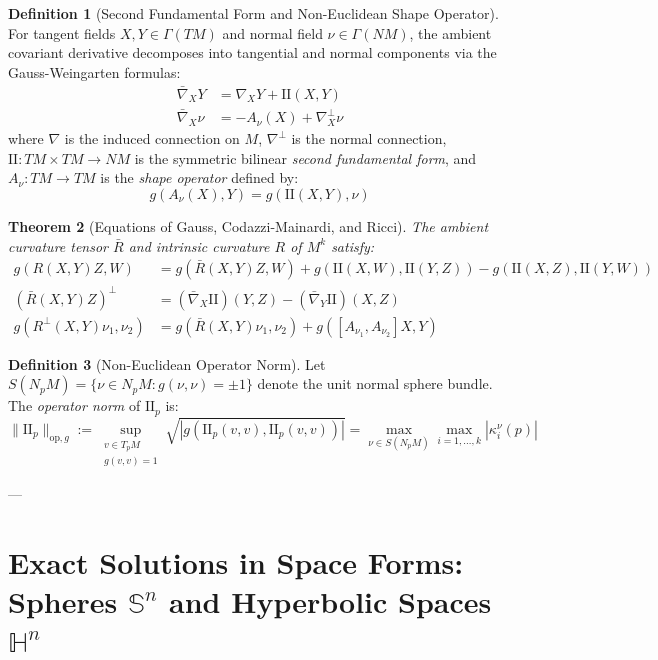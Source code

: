 \documentclass[11pt,reqno]{amsart}
\newtheorem{theorem}{Theorem}[section]
\theoremstyle{definition}
\newtheorem{definition}[theorem]{Definition}
\providecommand{\Hyp}{\mathbb{H}}
\providecommand{\Sph}{\mathbb{S}}
\providecommand{\II}{\mathrm{I\!I}}
\newcommand{\op}{\mathrm{op}}
\numberwithin{equation}{section}
\providecommand{\Hyp}{\mathbb{H}}
\providecommand{\Sph}{\mathbb{S}}
\providecommand{\II}{\mathrm{II}}
\begin{document}
\begin{definition}[Second Fundamental Form and Non-Euclidean Shape Operator]
For tangent fields $X, Y \in \Gamma(TM)$ and normal field $\nu \in \Gamma(NM)$, the ambient covariant derivative decomposes into tangential and normal components via the Gauss-Weingarten formulas:
\begin{align}
\bar{\nabla}_X Y &= \nabla_X Y + \II(X, Y) \\
\bar{\nabla}_X \nu &= -A_\nu(X) + \nabla^\perp_X \nu
\end{align}
where $\nabla$ is the induced connection on $M$, $\nabla^\perp$ is the normal connection, $\II: TM \times TM \to NM$ is the symmetric bilinear \emph{second fundamental form}, and $A_\nu: TM \to TM$ is the \emph{shape operator} defined by:
\begin{equation}
g(A_\nu(X), Y) = g(\II(X, Y), \nu)
\end{equation}
\end{definition}

\begin{theorem}[Equations of Gauss, Codazzi-Mainardi, and Ricci]
The ambient curvature tensor $\bar{R}$ and intrinsic curvature $R$ of $M^k$ satisfy:
\begin{align}
\label{eq:gauss}
g(R(X,Y)Z, W) &= g(\bar{R}(X,Y)Z, W) + g(\II(X,W), \II(Y,Z)) - g(\II(X,Z), \II(Y,W)) \\
\label{eq:codazzi}
(\bar{R}(X,Y)Z)^\perp &= (\bar{\nabla}_X \II)(Y,Z) - (\bar{\nabla}_Y \II)(X,Z) \\
\label{eq:ricci}
g(R^\perp(X,Y)\nu_1, \nu_2) &= g(\bar{R}(X,Y)\nu_1, \nu_2) + g([A_{\nu_1}, A_{\nu_2}]X, Y)
\end{align}
\end{theorem}

\begin{definition}[Non-Euclidean Operator Norm]
Let $S(N_pM) = \{\nu \in N_pM : g(\nu, \nu) = \pm 1\}$ denote the unit normal sphere bundle. The \emph{operator norm} of $\II_p$ is:
\begin{equation}
\|\II_p\|_{\op, g} := \sup_{\substack{v \in T_pM \\ g(v,v) = 1}} \sqrt{|g(\II_p(v,v), \II_p(v,v))|} = \max_{\nu \in S(N_pM)} \max_{i=1,\dots,k} |\kappa_i^\nu(p)|
\end{equation}
\end{definition}

---

\section{Exact Solutions in Space Forms: Spheres \texorpdfstring{$\Sph^n$}{S\textasciicircum n} and Hyperbolic Spaces \texorpdfstring{$\Hyp^n$}{H\textasciicircum n}}
\end{document}
